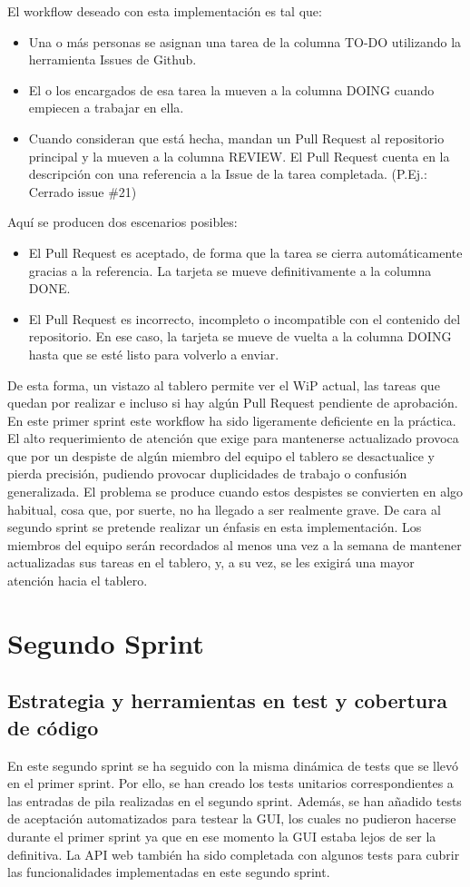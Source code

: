 \documentclass[11pt,a4paper]{report}
\begin{document}
El workflow deseado con esta implementación es tal que:
\begin{itemize}
	\item Una o más personas se asignan una tarea de la columna TO-DO utilizando la herramienta Issues de Github.
	\item El o los encargados de esa tarea la mueven a la columna DOING cuando empiecen a trabajar en ella.
	\item Cuando consideran que está hecha, mandan un Pull Request al repositorio principal y la mueven a la columna REVIEW. El Pull Request cuenta en la descripción con una referencia a la Issue de la tarea completada. (P.Ej.: Cerrado issue \#21)
\end{itemize}
Aquí se producen dos escenarios posibles:
\begin{itemize}
\item El Pull Request es aceptado, de forma que la tarea se cierra automáticamente gracias a la referencia. La tarjeta se mueve definitivamente a la columna DONE.
\item El Pull Request es incorrecto, incompleto o incompatible con el contenido del repositorio. En ese caso, la tarjeta se mueve de vuelta a la columna DOING hasta que se esté listo para volverlo a enviar.
\end{itemize}
De esta forma, un vistazo al tablero permite ver el WiP actual, las tareas que quedan por realizar e incluso si hay algún Pull Request pendiente de aprobación.
En este primer sprint este workflow ha sido ligeramente deficiente en la práctica. El alto requerimiento de atención que exige para mantenerse actualizado provoca que por un despiste de algún miembro del equipo el tablero se desactualice y pierda precisión, pudiendo provocar duplicidades de trabajo o confusión generalizada. El problema se produce cuando estos despistes se convierten en algo habitual, cosa que, por suerte, no ha llegado a ser realmente grave.
De cara al segundo sprint se pretende realizar un énfasis en esta implementación. Los miembros del equipo serán recordados al menos una vez a la semana de mantener actualizadas sus tareas en el tablero, y, a su vez, se les exigirá una mayor atención hacia el tablero.
\section{Segundo Sprint}
\subsection{Estrategia y herramientas en test y cobertura de código}
En este segundo sprint se ha seguido con la misma dinámica de tests que se llevó en el primer sprint. Por ello, se han creado los tests unitarios correspondientes a las entradas de pila realizadas en el segundo sprint. Además, se han añadido tests de aceptación automatizados para testear la GUI, los cuales no pudieron hacerse durante el primer sprint ya que en ese momento la GUI estaba lejos de ser la definitiva. La API web también ha sido completada con algunos tests para cubrir las funcionalidades implementadas en este segundo sprint.
\end{document}
